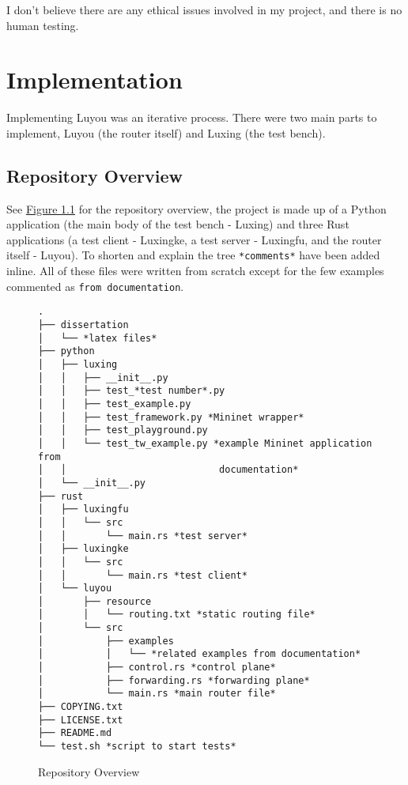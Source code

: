 \documentclass[12pt,a4paper,twoside,openany]{report}
\begin{document}
\bigskip

I don't believe there are any ethical issues involved in my project, and there is no human testing.

\chapter{Implementation}
\label{chap::implementation}

Implementing Luyou was an iterative process.  There were two main parts to implement, Luyou (the router itself) and Luxing (the test bench).

\section*{Repository Overview}

See \hyperref[fig::repository_overview]{Figure }\ref{fig::repository_overview} for the repository overview, the project is made up of a Python application (the main body of the test bench - Luxing) and three Rust applications (a test client - Luxingke, a test server - Luxingfu, and the router itself - Luyou). To shorten and explain the tree \verb!*comments*! have been added inline. All of these files were written from scratch except for the few examples commented as \verb!from documentation!. 

\begin{figure}
\begin{lstlisting}[style=tree]
.
├── dissertation
│   └── *latex files*
├── python
│   ├── luxing
│   │   ├── __init__.py
│   │   ├── test_*test number*.py
│   │   ├── test_example.py
│   │   ├── test_framework.py *Mininet wrapper*
│   │   ├── test_playground.py 
│   │   └── test_tw_example.py *example Mininet application from
│   │                           documentation*
│   └── __init__.py
├── rust
│   ├── luxingfu
│   │   └── src
│   │       └── main.rs *test server*
│   ├── luxingke
│   │   └── src
│   │       └── main.rs *test client*
│   └── luyou
│       ├── resource
│       │   └── routing.txt *static routing file*
│       └── src
│           ├── examples
│           │   └── *related examples from documentation*
│           ├── control.rs *control plane*
│           ├── forwarding.rs *forwarding plane*
│           └── main.rs *main router file*
├── COPYING.txt
├── LICENSE.txt
├── README.md
└── test.sh *script to start tests*
\end{lstlisting}
\caption{Repository Overview}
\label{fig::repository_overview}
\end{figure}
\end{document}

